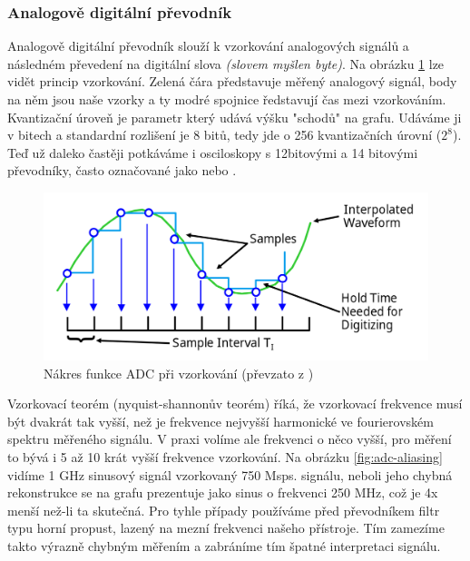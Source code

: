 \documentclass[12pt]{article}
\begin{document}
\newpage

\subsubsection{Analogově digitální převodník}

Analogově digitální převodník slouží k vzorkování analogových signálů a
následném převedení na digitální slova \emph{(slovem myšlen byte)}.
Na obrázku \ref{fig:adc-sampling} lze vidět princip vzorkování. Zelená
čára představuje měřený analogový signál, body na něm jsou naše vzorky a
ty modré spojnice ředstavují čas mezi vzorkováním. Kvantizační úroveň je
parametr který udává výšku "schodů" na grafu. Udáváme ji v bitech a standardní
rozlišení je 8 bitů, tedy jde o 256 kvantizačních úrovní ($2^8$).
Teď už daleko častěji potkáváme i osciloskopy s 12bitovými a 14 bitovými
převodníky, často označované jako  nebo .

\begin{figure}[h]
    \centering
    \includegraphics[width=\textwidth]{adc-sampling}
    \caption{Nákres funkce ADC při vzorkování (převzato z \cite{OscilloscopeBasicsPrimer})}
    \label{fig:adc-sampling}
\end{figure}

Vzorkovací teorém (nyquist-shannonův teorém) říká, že vzorkovací frekvence
musí být dvakrát tak vyšší, než je frekvence nejvyšší harmonické ve fourierovském
spektru měřeného signálu. V praxi volíme ale frekvenci o něco vyšší, pro měření to
bývá i 5 až 10 krát vyšší frekvence vzorkování. \cite{MereniKolemNas} Na obrázku \ref{fig:adc-aliasing}
vidíme 1 GHz sinusový signál vzorkovaný 750 Msps.  signálu, neboli
jeho chybná rekonstrukce se na grafu prezentuje jako sinus o frekvenci 250 MHz,
což je 4x menší než-li ta skutečná. Pro tyhle případy používáme před převodníkem
filtr typu horní propust, lazený na mezní frekvenci našeho přístroje. Tím zamezíme
takto výrazně chybným měřením a zabráníme tím špatné interpretaci signálu.
\end{document}
